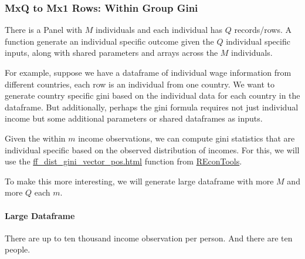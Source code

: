 \documentclass[
]{book}
\begin{document}
\hypertarget{mxq-to-mx1-rows-within-group-gini}{%
\subsubsection{MxQ to Mx1 Rows: Within Group Gini}\label{mxq-to-mx1-rows-within-group-gini}}

There is a Panel with \(M\) individuals and each individual has \(Q\) records/rows. A function generate an individual specific outcome given the \(Q\) individual specific inputs, along with shared parameters and arrays across the \(M\) individuals.

For example, suppose we have a dataframe of individual wage information from different countries, each row is an individual from one country. We want to generate country specific gini based on the individual data for each country in the dataframe. But additionally, perhaps the gini formula requires not just individual income but some additional parameters or shared dataframes as inputs.

Given the within \(m\) income observations, we can compute gini statistics that are individual specific based on the observed distribution of incomes. For this, we will use the \href{https://fanwangecon.github.io/REconTools/reference/ff_dist_gini_vector_pos.html}{ff\_dist\_gini\_vector\_pos.html} function from \href{https://fanwangecon.github.io/REconTools/}{REconTools}.

To make this more interesting, we will generate large dataframe with more \(M\) and more \(Q\) each \(m\).

\hypertarget{large-dataframe}{%
\paragraph{Large Dataframe}\label{large-dataframe}}

There are up to ten thousand income observation per person. And there are ten people.
\end{document}
